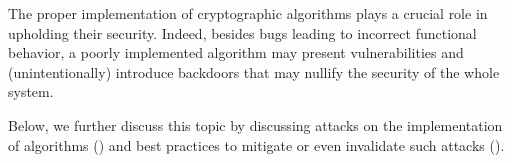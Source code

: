 The proper implementation of cryptographic algorithms plays a crucial role in upholding their security. Indeed, besides bugs leading to incorrect functional behavior, a poorly implemented algorithm may present vulnerabilities and (unintentionally) introduce backdoors that may nullify the security of the whole system. 

Below, we further discuss this topic by discussing attacks on the implementation of algorithms () and best practices to mitigate or even invalidate such attacks ().